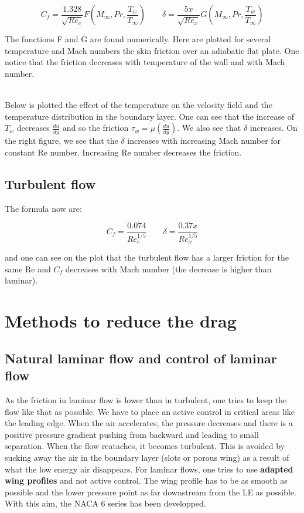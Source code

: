  	\begin{equation}
 	C_f = \frac{1.328}{\sqrt{Re_c}}F \left( M_\infty , Pr, \frac{T_w}{T_\infty} \right)\qquad \delta = \frac{5x}{\sqrt{Re_x}}G \left( M_\infty , Pr, \frac{T_w}{T_\infty} \right)
 	\end{equation}
 	
 	The functions F and G are found numerically. Here are plotted for several temperature and Mach numbers the skin friction over an adiabatic flat plate. One notice that the friction decreases with temperature of the wall and with Mach number. 
 	
	\ \\ Below is plotted the effect of the temperature on the velocity field and the temperature distribution in the boundary layer. One can see that the increase of $T_w$ decreases $\frac{du}{dy}$ and so the friction $\tau _w = \mu (\frac{du}{dy})$. We also see that $\delta$ increases. On the right figure, we see that the $\delta$ increases with increasing Mach number for constant Re number. Increasing Re number decreases the friction.  
	
 	
\subsection{Turbulent flow}
	The formula now are:
	
	\begin{equation}
	C_f = \frac{0.074}{Re_c^{1/5}} \qquad \delta = \frac{0.37x}{Re_x^{1/5}}
	\end{equation}
	
	and one can see on the plot that the turbulent flow has a larger friction for the same Re and $C_f$ decreases with Mach number (the decrease is higher than laminar).

\section{Methods to reduce the drag}
\subsection{Natural laminar flow and control of laminar flow}
	As the friction in laminar flow is lower than in turbulent, one tries to keep the flow like that as possible. We have to place an active control in critical areas like the leading edge. When the air accelerates, the pressure decreases and there is a positive pressure gradient pushing from backward and leading to small separation. When the flow reataches, it becomes turbulent. This is avoided by sucking away the air in the boundary layer (slots or porous wing) as a result of what the low energy air disappears. For laminar flows, one tries to use \textbf{adapted wing profiles} and not active control. The wing profile has to be as smooth as possible and the lower pressure point as far downstream from the LE as possible. With this aim, the NACA 6 series has been developped. \\
	
